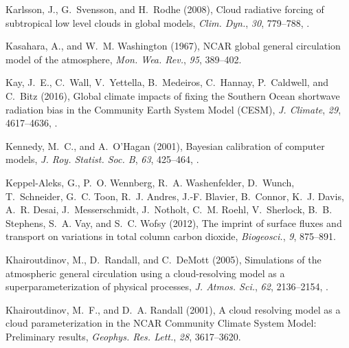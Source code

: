 \documentclass[draft]{agujournal}
\begin{document}
\begin{thebibliography}{196}
Karlsson, J., G.~Svensson, and H.~Rodhe (2008), Cloud radiative forcing of
  subtropical low level clouds in global models, \textit{Clim. Dyn.},
  \textit{30}, 779--788, .

Kasahara, A., and W.~M. Washington (1967), {NCAR} global general circulation
  model of the atmosphere, \textit{Mon. Wea. Rev.}, \textit{95}, 389--402.

Kay, J.~E., C.~Wall, V.~Yettella, B.~Medeiros, C.~Hannay, P.~Caldwell, and
  C.~Bitz (2016), Global climate impacts of fixing the {S}outhern {O}cean
  shortwave radiation bias in the {C}ommunity {E}arth {S}ystem {M}odel
  {(CESM)}, \textit{J. Climate}, \textit{29}, 4617--4636,
  .

Kennedy, M.~C., and A.~O'Hagan (2001), Bayesian calibration of computer models,
  \textit{J. Roy. Statist. Soc. B}, \textit{63}, 425--464,
  .

Keppel-Aleks, G., P.~O. Wennberg, R.~A. Washenfelder, D.~Wunch, T.~Schneider,
  G.~C. Toon, R.~J. Andres, J.-F. Blavier, B.~Connor, K.~J. Davis, A.~R. Desai,
  J.~Messerschmidt, J.~Notholt, C.~M. Roehl, V.~Sherlock, B.~B. Stephens, S.~A.
  Vay, and S.~C. Wofsy (2012), The imprint of surface fluxes and transport on
  variations in total column carbon dioxide, \textit{Biogeosci.}, \textit{9},
  875--891.

Khairoutdinov, M., D.~Randall, and C.~DeMott (2005), Simulations of the
  atmospheric general circulation using a cloud-resolving model as a
  superparameterization of physical processes, \textit{J. Atmos. Sci.},
  \textit{62}, 2136--2154, .

Khairoutdinov, M.~F., and D.~A. Randall (2001), A cloud resolving model as a
  cloud parameterization in the {NCAR} {C}ommunity {C}limate {S}ystem {M}odel:
  {P}reliminary results, \textit{Geophys. Res. Lett.}, \textit{28}, 3617--3620.


\end{thebibliography}
\end{document}
